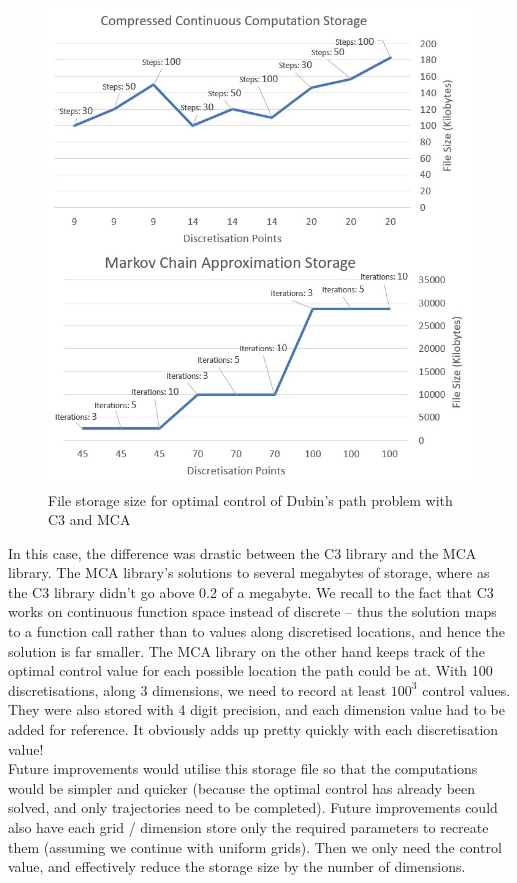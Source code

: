 \documentclass[11pt,draftd]{article}
\begin{document}
\begin{figure}[H]
	\centering
	\includegraphics[scale=0.57]{images/c3Storage.jpg}
	\caption{File storage size for optimal control of Dubin's path problem with C3 and MCA}
\end{figure}

In this case, the difference was drastic between the C3 library and the MCA library. The MCA library's solutions to several megabytes of storage, where as the C3 library didn't go above 0.2 of a megabyte. We recall to the fact that C3 works on continuous function space instead of discrete -- thus the solution maps to a function call rather than to values along discretised locations, and hence the solution is far smaller. The MCA library on the other hand keeps track of the optimal control value for each possible location the path could be at. With 100 discretisations, along 3 dimensions, we need to record at least $ 100^{3} $ control values. They were also stored with 4 digit precision, and each dimension value had to be added for reference. It obviously adds up pretty quickly with each discretisation value! \\

Future improvements would utilise this storage file so that the computations would be simpler and quicker (because the optimal control has already been solved, and only trajectories need to be completed). Future improvements could also have each grid / dimension store only the required parameters to recreate them (assuming we continue with uniform grids). Then we only need the control value, and effectively reduce the storage size by the number of dimensions. \\
\end{document}
